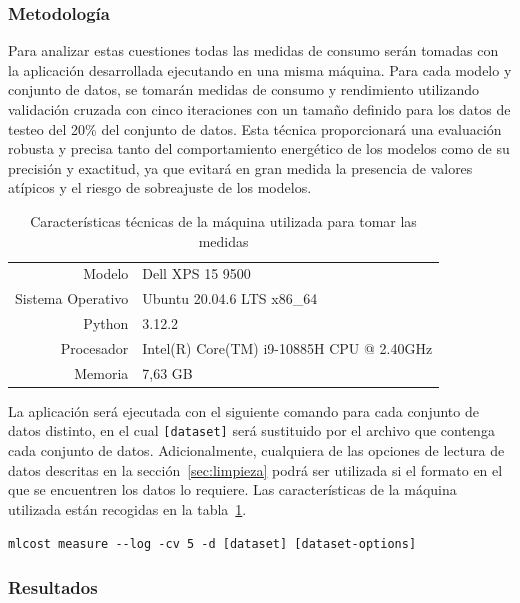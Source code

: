 \subsubsection{Metodología}

Para analizar estas cuestiones todas las medidas de consumo serán tomadas con la aplicación desarrollada ejecutando en una misma máquina. Para cada modelo y conjunto de datos, se tomarán medidas de consumo y rendimiento utilizando validación cruzada con cinco iteraciones con un tamaño definido para los datos de testeo del 20\% del conjunto de datos. Esta técnica proporcionará una evaluación robusta y precisa tanto del comportamiento energético de los modelos como de su precisión y exactitud, ya que evitará en gran medida la presencia de valores atípicos y el riesgo de sobreajuste de los modelos.

\begin{table}[h]
    \centering
    \begin{tabular}{rl}
         Modelo & Dell XPS 15 9500\\
         Sistema Operativo & Ubuntu 20.04.6 LTS x86\_64\\
         Python & 3.12.2\\
         Procesador & Intel(R) Core(TM) i9-10885H CPU @ 2.40GHz\\
         Memoria & 7,63 GB\\
    \end{tabular}
    \caption{Características técnicas de la máquina utilizada para tomar las medidas}
    \label{tab:caracteristicas-tecnicas}
\end{table}

La aplicación será ejecutada con el siguiente comando para cada conjunto de datos distinto, en el cual \texttt{[dataset]} será sustituido por el archivo que contenga cada conjunto de datos. Adicionalmente, cualquiera de las opciones de lectura de datos descritas en la sección~\ref{sec:limpieza} podrá ser utilizada si el formato en el que se encuentren los datos lo requiere. Las características de la máquina utilizada están recogidas en la tabla~\ref{tab:caracteristicas-tecnicas}.
\begin{verbatim}
mlcost measure --log -cv 5 -d [dataset] [dataset-options]
\end{verbatim}

\subsubsection{Resultados}

